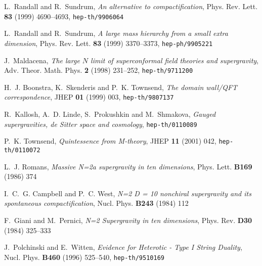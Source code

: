 \documentclass[12pt,a4paper]{article}
\begin{document}
\providecommand{\href}[2]{#2}\begingroup\raggedright\begin{thebibliography}{10}

L.~Randall and R.~Sundrum, \emph{An alternative to compactification}, Phys.
  Rev. Lett. {\bf 83} (1999) 4690--4693,
\href{http://www.arXiv.org/abs/hep-th/9906064}{{\tt hep-th/9906064}}

L.~Randall and R.~Sundrum, \emph{A large mass hierarchy from a small extra
  dimension}, Phys. Rev. Lett. {\bf 83} (1999) 3370--3373,
\href{http://www.arXiv.org/abs/hep-ph/9905221}{{\tt hep-ph/9905221}}

J.~Maldacena, \emph{The large $N$ limit of superconformal field theories and
  supergravity}, Adv. Theor. Math. Phys. {\bf 2} (1998) 231--252,
\href{http://arXiv.org/abs/hep-th/9711200}{{\tt hep-th/9711200}}

H.~J. Boonstra, K.~Skenderis  and P.~K. Townsend, \emph{The domain wall/QFT
  correspondence}, JHEP {\bf 01} (1999) 003,
\href{http://arXiv.org/abs/hep-th/9807137}{{\tt hep-th/9807137}}

R.~Kallosh, A.~D. Linde, S.~Prokushkin  and M.~Shmakova, \emph{Gauged
  supergravities, de Sitter space and cosmology},
\href{http://arXiv.org/abs/hep-th/0110089}{{\tt hep-th/0110089}}

P.~K. Townsend, \emph{Quintessence from M-theory}, JHEP {\bf 11} (2001) 042,
\href{http://arXiv.org/abs/hep-th/0110072}{{\tt hep-th/0110072}}

L.~J. Romans, \emph{Massive N=2a supergravity in ten dimensions}, Phys. Lett.
  {\bf B169} (1986)
374

I.~C.~G. Campbell and P.~C. West, \emph{N=2 D = 10 nonchiral supergravity and
  its spontaneous compactification}, Nucl. Phys. {\bf B243} (1984)
112

F.~Giani and M.~Pernici, \emph{N=2 Supergravity in ten dimensions}, Phys. Rev.
  {\bf D30} (1984)
325--333

J.~Polchinski and E.~Witten, \emph{Evidence for Heterotic - Type I String
  Duality}, Nucl. Phys. {\bf B460} (1996) 525--540,
\href{http://arXiv.org/abs/hep-th/9510169}{{\tt hep-th/9510169}}


\end{thebibliography}
\end{document}
